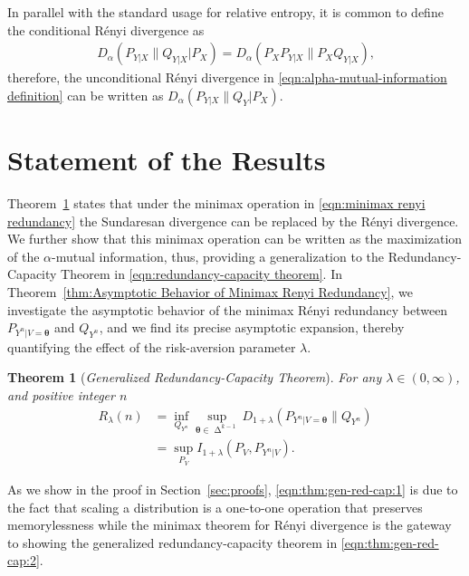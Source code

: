 \documentclass[journal, 10pt]{IEEEtran}
\theoremstyle{plain}
\newtheorem{thm}{Theorem}%
\theoremstyle{plain}
\theoremstyle{plain}
\theoremstyle{plain}
\newcommand{\boldtheta}{\mathbold{\theta}}
\newcommand{\simplex}{\operatorname{\Delta}}
\begin{document}
In parallel with the standard usage for relative entropy, it is common to define the conditional R\'enyi divergence as
\begin{align}
	D_\alpha(P_{Y|X}\|Q_{Y|X}|P_X )=D_\alpha(P_X P_{Y|X} \| P_X Q_{Y|X} )\text{,}
\end{align}
therefore, the unconditional R\'enyi divergence in \eqref{eqn:alpha-mutual-information definition} can be written as $D_\alpha(P_{Y|X }\| Q_{Y}|P_X ) $.

\section{Statement of the Results}\label{sec:main results}

Theorem~\ref{thm:Generalized Redundancy-Capacity Theorem} states that under the minimax operation in \eqref{eqn:minimax renyi redundancy} the Sundaresan divergence can be replaced by the R\'enyi divergence. We further show that this minimax operation can be written as the maximization of the $\alpha$-mutual information, thus, providing a generalization to the Redundancy-Capacity Theorem in \eqref{eqn:redundancy-capacity theorem}. In Theorem~\ref{thm:Asymptotic Behavior of Minimax Renyi Redundancy}, we investigate the asymptotic behavior of the minimax R\'enyi redundancy between $P_{Y^n|V=\boldtheta}$ and $Q_{Y^n}$, and we find its precise asymptotic expansion, thereby quantifying the effect of the risk-aversion parameter $\lambda$.


\begin{thm}[\textit{\textsf{\small Generalized Redundancy-Capacity Theorem}}] \label{thm:Generalized Redundancy-Capacity Theorem} 
For any $\lambda \in (0,\infty) $, and positive integer $n$ 
	\begin{align}
R_\lambda(n)
&=\inf_{Q_{Y^n}} \sup_{\boldtheta\in \simplex^{k-1} }D_{1+\lambda}(P_{Y^n|V=\boldtheta}  \| Q_{Y^n} ) \label{eqn:thm:gen-red-cap:1}  \\
&=\sup_{P_V} I_{1+\lambda} (P_V, P_{Y^n|V})\text{.} \label{eqn:thm:gen-red-cap:2}
	\end{align}
\end{thm}

As we show in the proof in Section~\ref{sec:proofs}, \eqref{eqn:thm:gen-red-cap:1} is due to the fact that scaling a distribution is a one-to-one operation that preserves memorylessness while the minimax theorem for R\'enyi divergence \cite[Theorem 34]{Erven2014} is the gateway to showing the generalized redundancy-capacity theorem in \eqref{eqn:thm:gen-red-cap:2}. 
\end{document}
